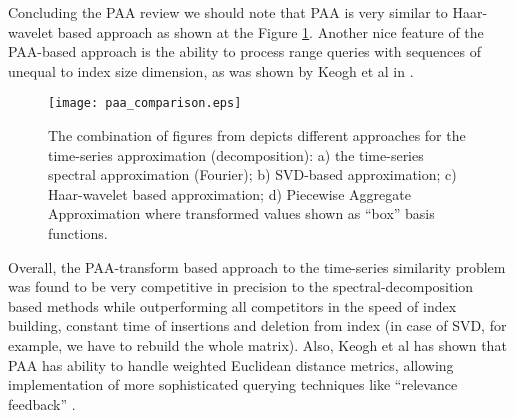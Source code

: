 Concluding the PAA review we should note that PAA is very similar to Haar-wavelet based approach \cite{citeulike:4384535} as shown at the Figure \ref{fig:paa_comparison}. Another nice feature of the PAA-based approach is the ability to process range queries with sequences of unequal to index size dimension, as was shown by Keogh et al in \cite{citeulike:3000416}.
\begin{figure}[tbp]
   \centering
   \texttt{[image: paa\_comparison.eps]}
   \caption{The combination of figures from \cite{citeulike:3000416} depicts different approaches for the time-series approximation (decomposition): a) the time-series spectral approximation (Fourier); b) SVD-based approximation; c) Haar-wavelet based approximation; d) Piecewise Aggregate Approximation where transformed values shown as ``box'' basis functions.}
   \label{fig:paa_comparison}
\end{figure} 

Overall, the PAA-transform based approach to the time-series similarity problem was found to be very competitive in precision to the spectral-decomposition based methods while outperforming all competitors in the speed of index building, constant time of insertions and deletion from index (in case of SVD, for example, we have to rebuild the whole matrix). Also, Keogh et al has shown that PAA has ability to handle weighted Euclidean distance metrics, allowing implementation of more sophisticated querying techniques like ``relevance feedback'' \cite{citeulike:4406444}.
